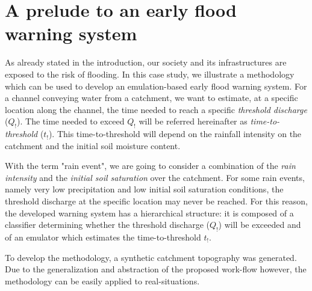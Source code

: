 \newpage

\section{A prelude to an early flood warning system}
\label{sec:hydrological_emulator}




As already stated in the introduction, our society and its infrastructures are exposed to the risk of flooding.
In this case study, we illustrate a methodology which can be used to develop an emulation-based early flood warning system.
For a channel conveying water from a catchment, we want to estimate, at a specific location along the channel, the time needed to reach a specific \emph{threshold discharge} ($Q_!$). 
The time needed to exceed $Q_!$ will be referred hereinafter as \emph{time-to-threshold} ($t_!$). 
This time-to-threshold will depend on the rainfall intensity on the catchment and the initial soil moisture content.

With the term "rain event", we are going to consider a combination of the \emph{rain intensity} and the \emph{initial soil saturation} over the catchment. 
For some rain events, namely very low precipitation and low initial soil saturation conditions, the threshold discharge at the specific location may never be reached.
For this reason, the developed warning system has a hierarchical structure: it is composed of a classifier determining whether the threshold discharge ($Q_!$) will be exceeded and of an emulator which estimates the time-to-threshold $t_!$.

To develop the methodology, a synthetic catchment topography was generated. Due to the generalization and abstraction of the proposed work-flow however, the methodology can be easily applied to real-situations. 
 

